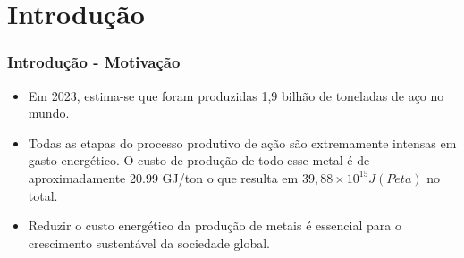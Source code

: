 \section{Introdução}

\begin{frame}

    \frametitle{Introdução - Motivação}
    \begin{itemize}
        \item Em 2023, estima-se que foram produzidas 1,9 bilhão de toneladas de aço no mundo. \cite{worldsteel.org_2024}
        \item Todas as etapas do processo produtivo de ação são extremamente intensas em gasto energético. O custo de produção de todo esse metal é de aproximadamente 20.99 GJ/ton o que resulta em $39,88\times10^{15}J (Peta)$ no total.
        \item Reduzir o custo energético da produção de metais é essencial para o crescimento sustentável da sociedade global.
    \end{itemize}
\end{frame}


